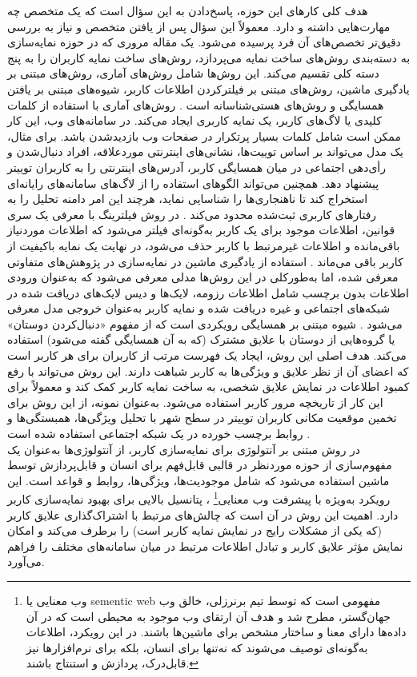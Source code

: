 هدف کلی کارهای این حوزه، پاسخ‌دادن به این سؤال است که یک متخصص چه مهارت‌هایی داشته و دارد. معمولاً این سؤال پس از یافتن متخصص و نیاز به بررسی دقیق‌تر تخصص‌های آن فرد پرسیده می‌شود\cite{balog_determining_2007}. یک مقاله مروری که در حوزه نمایه‌سازی به دسته‌بندی روش‌های ساخت نمایه می‌پردازد، روش‌های ساخت نمایه کاربران را به پنج دسته کلی تقسیم می‌کند. این روش‌ها شامل روش‌های آماری، روش‌های مبتنی بر یادگیری ماشین، روش‌های مبتنی بر فیلترکردن اطلاعات کاربر، شیوه‌های مبتنی بر یافتن همسایگی و روش‌های هستی‌شناسانه است \cite{eke_survey_2019}. روش‌های آماری با استفاده از کلمات کلیدی یا لاگ‌های کاربر، یک نمایه کاربری ایجاد می‌کند. در سامانه‌های وب، این کار ممکن است شامل کلمات بسیار پرتکرار در صفحات وب بازدیدشدن باشد. برای مثال، یک مدل می‌تواند بر اساس توییت‌ها، نشانی‌های اینترنتی موردعلاقه، افراد دنبال‌شدن و رأی‌دهی اجتماعی در میان همسایگی کاربر، آدرس‌های اینترنتی را به کاربران توییتر پیشنهاد دهد. همچنین می‌تواند الگوهای استفاده را از لاگ‌های سامانه‌های رایانه‌ای استخراج کند تا ناهنجاری‌ها را شناسایی نماید، هرچند این امر دامنه تحلیل را به رفتارهای کاربری ثبت‌شده محدود می‌کند \cite{tang_combination_2010}. در روش فیلترینگ با معرفی یک سری قوانین، اطلاعات موجود برای یک کاربر به‌گونه‌ای فیلتر می‌شود که اطلاعات موردنیاز باقی‌مانده و اطلاعات غیرمرتبط با کاربر حذف می‌شود، در نهایت یک نمایه باکیفیت از کاربر باقی می‌ماند \cite{linden_amazoncom_2003}. استفاده از یادگیری ماشین در نمایه‌سازی در پژوهش‌های متفاوتی معرفی شده، اما به‌طورکلی در این روش‌ها مدلی معرفی می‌شود که به‌عنوان ورودی اطلاعات بدون برچسب شامل اطلاعات رزومه، لایک‌ها و دیس لایک‌های دریافت شده در شبکه‌های اجتماعی و غیره دریافت شده و نمایه کاربر به‌عنوان خروجی مدل معرفی می‌شود \cite{eke_survey_2019}. شیوه مبتنی بر همسایگی رویکردی است که از مفهوم «دنبال‌کردن دوستان» یا گروه‌هایی از دوستان با علایق مشترک (که به آن همسایگی گفته می‌شود) استفاده می‌کند. هدف اصلی این روش، ایجاد یک فهرست مرتب از کاربران برای هر کاربر است که اعضای آن از نظر علایق و ویژگی‌ها به کاربر شباهت دارند. این روش می‌تواند با رفع کمبود اطلاعات در نمایش علایق شخصی، به ساخت نمایه کاربر کمک کند و معمولاً برای این کار از تاریخچه مرور کاربر استفاده می‌شود. به‌عنوان نمونه، از این روش برای تخمین موقعیت مکانی کاربران توییتر در سطح شهر با تحلیل ویژگی‌ها، همبستگی‌ها و روابط برچسب خورده در یک شبکه اجتماعی استفاده شده است \cite{sugiyama_adaptive_2004}.
\\
در روش مبتنی بر آنتولوژی برای نمایه‌سازی کاربر، از آنتولوژی‌ها به‌عنوان یک مفهوم‌سازی از حوزه موردنظر در قالبی قابل‌فهم برای انسان و قابل‌پردازش توسط ماشین استفاده می‌شود که شامل موجودیت‌ها، ویژگی‌ها، روابط و قواعد است. این رویکرد به‌ویژه با پیشرفت وب معنایی\footnote{وب معنایی یا sementic web  مفهومی است که توسط تیم برنرزلی، خالق وب جهان‌گستر، مطرح شد و هدف آن ارتقای وب موجود به محیطی است که در آن داده‌ها دارای معنا و ساختار مشخص برای ماشین‌ها باشند. در این رویکرد، اطلاعات به‌گونه‌ای توصیف می‌شوند که نه‌تنها برای انسان، بلکه برای نرم‌افزارها نیز قابل‌درک، پردازش و استنتاج باشند.} ، پتانسیل بالایی برای بهبود نمایه‌سازی کاربر دارد. اهمیت این روش در آن است که چالش‌های مرتبط با اشتراک‌گذاری علایق کاربر (که یکی از مشکلات رایج در نمایش نمایه کاربر است) را برطرف می‌کند و امکان نمایش مؤثر علایق کاربر و تبادل اطلاعات مرتبط در میان سامانه‌های مختلف را فراهم می‌آورد\cite{han_method_2013}.


